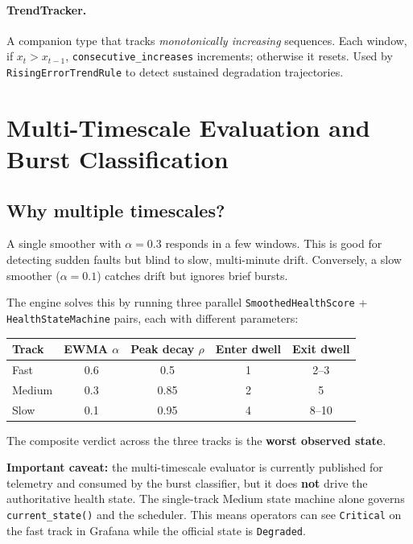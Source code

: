 \documentclass[11pt]{article}
\begin{document}
\paragraph{TrendTracker.}
A companion type that tracks \emph{monotonically increasing} sequences.
Each window, if $x_t > x_{t-1}$, \texttt{consecutive\_increases}
increments; otherwise it resets. Used by \texttt{RisingErrorTrendRule}
to detect sustained degradation trajectories.


\section{Multi-Timescale Evaluation and Burst Classification}
\label{sec:timescale}

\subsection{Why multiple timescales?}

A single smoother with $\alpha = 0.3$ responds in a few windows. This is
good for detecting sudden faults but blind to slow, multi-minute drift.
Conversely, a slow smoother ($\alpha = 0.1$) catches drift but ignores brief
bursts.

The engine solves this by running three parallel
\texttt{SmoothedHealthScore} + \texttt{HealthStateMachine} pairs, each with
different parameters:

\begin{center}
\begin{tabular}{lcccc}
\toprule
Track & EWMA $\alpha$ & Peak decay $\rho$ & Enter dwell & Exit dwell \\
\midrule
Fast   & 0.6 & 0.5  & 1 & 2--3 \\
Medium & 0.3 & 0.85 & 2 & 5 \\
Slow   & 0.1 & 0.95 & 4 & 8--10 \\
\bottomrule
\end{tabular}
\end{center}

The composite verdict across the three tracks is the \textbf{worst observed
state}.

\begin{warningbox}
  \textbf{Important caveat:} the multi-timescale evaluator is currently
  published for telemetry and consumed by the burst classifier, but it does
  \textbf{not} drive the authoritative health state. The single-track Medium
  state machine alone governs \texttt{current\_state()} and the scheduler.
  This means operators can see \texttt{Critical} on the fast track in Grafana
  while the official state is \texttt{Degraded}.
\end{warningbox}
\end{document}
